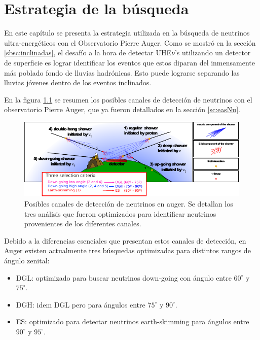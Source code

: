 \chapter{Estrategia de la búsqueda}
\label{ch:estrategiaAuger}

En este capítulo se presenta la estrategia utilizada en la búsqueda de neutrinos ultra-energéticos con el Observatorio Pierre Auger.
Como se mostró en la sección \ref{sbsc:inclinadas}, el desafío a la hora de detectar UHE$\nu$'s utilizando un detector de superficie es lograr identificar los eventos que estos diparan del inmensamente más poblado fondo de lluvias hadrónicas.
Esto puede lograrse separando las lluvias jóvenes dentro de los eventos inclinados.

En la figura \ref{fig:augerNu} se resumen los posibles canales de detección de neutrinos con el observatorio Pierre Auger, que ya fueron detallados en la sección \ref{sc:easNu}.
	\begin{figure}[ht!]
		\centering
		\includegraphics[width=\textwidth]{./fig/estrategiaAuger/auger_nu}
		\caption{\label{fig:augerNu}
		Posibles canales de detección de neutrinos en auger. Se detallan los tres análisis que fueron optimizados para identificar neutrinos provenientes de los diferentes canales.
		}
	\end{figure}
Debido a la diferencias esenciales que presentan estos canales de detección, en Auger existen actualmente tres búsquedas optimizadas para distintos rangos de ángulo zenital:
\begin{itemize}
 \item DGL: optimizado para buscar neutrinos down-going con ángulo entre $60^\circ$ y $75^\circ$.
 \item DGH: idem DGL pero para ángulos entre $75^\circ$ y $90^\circ$. 
 \item ES: optimizado para detectar neutrinos earth-skimming para ángulos entre $90^\circ$ y $95^\circ$.
\end{itemize}

